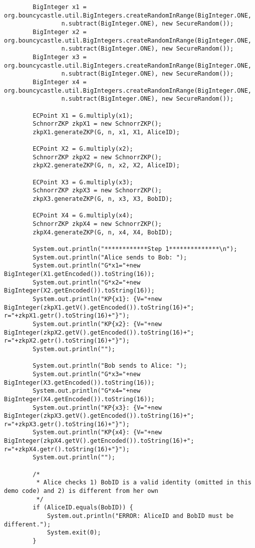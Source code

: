 \documentclass[../PFC.tex]{subfiles}
\begin{document}
\begin{lstlisting}
    	BigInteger x1 = org.bouncycastle.util.BigIntegers.createRandomInRange(BigInteger.ONE, 
    			n.subtract(BigInteger.ONE), new SecureRandom());
    	BigInteger x2 = org.bouncycastle.util.BigIntegers.createRandomInRange(BigInteger.ONE, 
    			n.subtract(BigInteger.ONE), new SecureRandom());
    	BigInteger x3 = org.bouncycastle.util.BigIntegers.createRandomInRange(BigInteger.ONE, 
    			n.subtract(BigInteger.ONE), new SecureRandom());
    	BigInteger x4 = org.bouncycastle.util.BigIntegers.createRandomInRange(BigInteger.ONE, 
    			n.subtract(BigInteger.ONE), new SecureRandom());
    	
    	ECPoint X1 = G.multiply(x1);
    	SchnorrZKP zkpX1 = new SchnorrZKP();
    	zkpX1.generateZKP(G, n, x1, X1, AliceID);
    	
    	ECPoint X2 = G.multiply(x2);
    	SchnorrZKP zkpX2 = new SchnorrZKP();
    	zkpX2.generateZKP(G, n, x2, X2, AliceID);
    	
    	ECPoint X3 = G.multiply(x3);
    	SchnorrZKP zkpX3 = new SchnorrZKP();
    	zkpX3.generateZKP(G, n, x3, X3, BobID);
    	
    	ECPoint X4 = G.multiply(x4);
    	SchnorrZKP zkpX4 = new SchnorrZKP();
    	zkpX4.generateZKP(G, n, x4, X4, BobID);
    	
    	System.out.println("************Step 1**************\n");
    	System.out.println("Alice sends to Bob: ");
    	System.out.println("G*x1="+new BigInteger(X1.getEncoded()).toString(16));
    	System.out.println("G*x2="+new BigInteger(X2.getEncoded()).toString(16));
    	System.out.println("KP{x1}: {V="+new BigInteger(zkpX1.getV().getEncoded()).toString(16)+"; r="+zkpX1.getr().toString(16)+"}");
    	System.out.println("KP{x2}: {V="+new BigInteger(zkpX2.getV().getEncoded()).toString(16)+"; r="+zkpX2.getr().toString(16)+"}");
    	System.out.println("");

    	System.out.println("Bob sends to Alice: ");
    	System.out.println("G*x3="+new BigInteger(X3.getEncoded()).toString(16));
    	System.out.println("G*x4="+new BigInteger(X4.getEncoded()).toString(16));
    	System.out.println("KP{x3}: {V="+new BigInteger(zkpX3.getV().getEncoded()).toString(16)+"; r="+zkpX3.getr().toString(16)+"}");
    	System.out.println("KP{x4}: {V="+new BigInteger(zkpX4.getV().getEncoded()).toString(16)+"; r="+zkpX4.getr().toString(16)+"}");
    	System.out.println("");
    	
    	/*
    	 * Alice checks 1) BobID is a valid identity (omitted in this demo code) and 2) is different from her own
    	 */
    	if (AliceID.equals(BobID)) {
    		System.out.println("ERROR: AliceID and BobID must be different.");
    		System.exit(0);
    	}
    	    	

\end{lstlisting}
\end{document}
